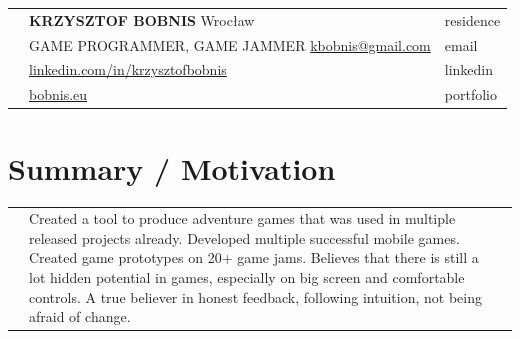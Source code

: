 \documentclass[12pt,a4paper]{article}
\begin{document}
\begin{tabular}  { >{\RaggedLeft}p{0cm} p{15.5cm}  p{2cm} }  
	& {\Large \textbf{KRZYSZTOF BOBNIS}} \hfill Wrocław & \textcolor{techColor}{residence} \\
	& GAME PROGRAMMER, GAME JAMMER \hfill  {\href{mailto:kbobnis@gmail.com}{kbobnis@gmail.com}} & \textcolor{techColor}{email} \\ 
	& \hfill {\href{https://www.linkedin.com/in/krzysztofbobnis}{linkedin.com/in/krzysztofbobnis}} & \textcolor{techColor}{linkedin} \\
	& \hfill {\href{http://bobnis.eu}{bobnis.eu}} & \textcolor{techColor}{portfolio} \\
\end{tabular}	 

\vspace{0.0cm}

\centering
\section*{Summary / Motivation}

	\begin{tabular}  { >{\RaggedLeft}p{0cm}  p{18cm}  p{0cm} }  

		 & Created a tool to produce adventure games that was used in multiple released projects already. Developed multiple successful mobile games. Created game prototypes on 20+ game jams. Believes that there is still a lot hidden potential in games, especially on big screen and comfortable controls. A true believer in honest feedback, following intuition, not being afraid of change. & \\
	\end{tabular}

\vspace*{1cm}
\end{document}
